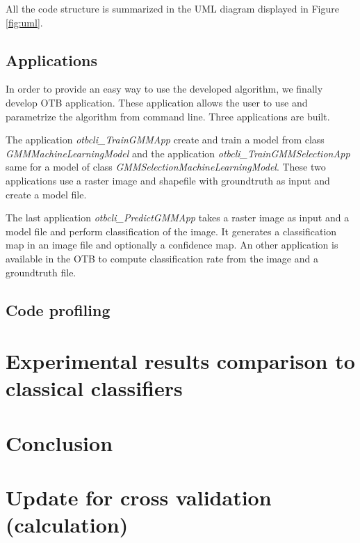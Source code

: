 \documentclass[a4paper,11pt,DIV=16]{scrartcl}
\begin{document}
        All the code structure is summarized in the UML diagram displayed in Figure \ref{fig:uml}.

        \subsection{Applications}

        In order to provide an easy way to use the developed algorithm, we finally develop OTB application. These application allows the user to use and parametrize the algorithm from command line. Three applications are built.

        The application \emph{otbcli\_TrainGMMApp} create and train a model from class \emph{GMMMachineLearningModel} and the application \emph{otbcli\_TrainGMMSelectionApp} same for a model of class \emph{GMMSelectionMachineLearningModel}. These two applications use a raster image and shapefile with groundtruth as input and create a model file.

        The last application \emph{otbcli\_PredictGMMApp} takes a raster image as input and a model file and perform classification of the image. It generates a classification map in an image file and optionally a confidence map. An other application is available in the OTB to compute classification rate from the image and a groundtruth file.

        \subsection{Code profiling}







    \section{Experimental results comparison to classical classifiers}



    \section{Conclusion}



\newpage

\appendix
\section{Update for cross validation (calculation)}
\label{app:cv_maj}
\end{document}
